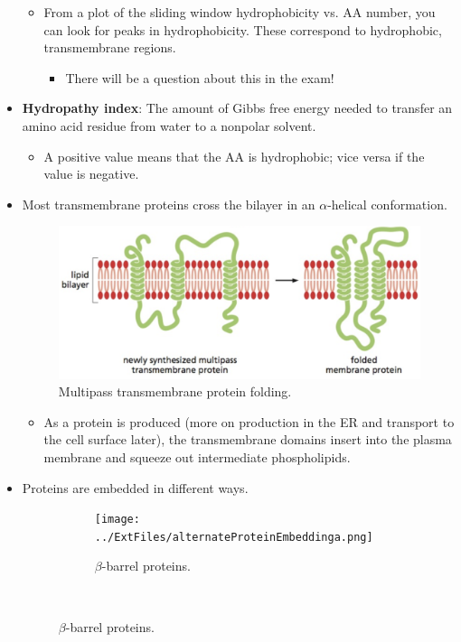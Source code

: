 \documentclass[../notes.tex]{subfiles}
\begin{document}
\begin{itemize}
\begin{itemize}
        \item From a plot of the sliding window hydrophobicity vs. AA number, you can look for peaks in hydrophobicity. These correspond to hydrophobic, transmembrane regions.
        \begin{itemize}
            \item There will be a question about this in the exam!
        \end{itemize}
    \end{itemize}
    \item \textbf{Hydropathy index}: The amount of Gibbs free energy needed to transfer an amino acid residue from water to a nonpolar solvent.
    \begin{itemize}
        \item A positive value means that the AA is hydrophobic; vice versa if the value is negative.
    \end{itemize}
    \item Most transmembrane proteins cross the bilayer in an $\alpha$-helical conformation.
    \begin{figure}[h!]
        \centering
        \includegraphics[width=0.4\linewidth]{../ExtFiles/multipassFolding.png}
        \caption{Multipass transmembrane protein folding.}
        \label{fig:multipassFolding}
    \end{figure}
    \begin{itemize}
        \item As a protein is produced (more on production in the ER and transport to the cell surface later), the transmembrane domains insert into the plasma membrane and squeeze out intermediate phospholipids.
    \end{itemize}
    \item Proteins are embedded in different ways.
    \begin{figure}[h!]
        \centering
        \begin{subfigure}[b]{\linewidth}
            \centering
            \texttt{[image: ../ExtFiles/alternateProteinEmbeddinga.png]}
            \caption{$\beta$-barrel proteins.}
            \label{fig:alternateProteinEmbeddinga}
        \end{subfigure}\\[1em]

\end{figure}
\end{itemize}
\end{document}

